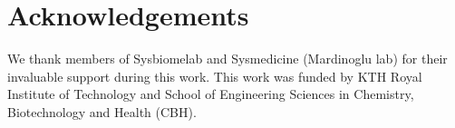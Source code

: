 \documentclass{article}
\begin{document}

\section*{Acknowledgements}
We thank members of Sysbiomelab and Sysmedicine (Mardinoglu lab) for their invaluable support during this work. This work was funded by KTH Royal Institute of Technology and School of Engineering Sciences in Chemistry,
Biotechnology and Health (CBH).
\end{document}
